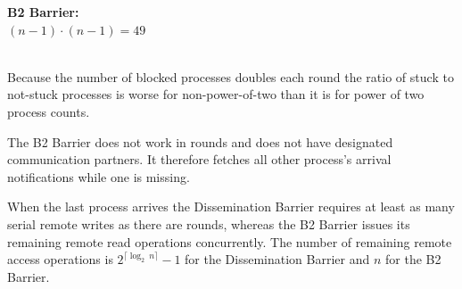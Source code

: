 \documentclass[a4paper, 10pt]{article}
\begin{document}
\begin{table}[htbp]
\begin{minipage}{0.42\linewidth}
{	}
\end{minipage}
\begin{minipage}{0.42\linewidth}
	\vspace{0.3cm}
	\textbf{B2 Barrier:} \\
	$(n-1) \cdot (n-1) = 49$ \\
	\vspace{-0.1cm} \\
\end{minipage}
\label{tab:table-dissemination-progress}
\end{table}

Because the number of blocked processes doubles each round the ratio of stuck to not-stuck processes is worse for non-power-of-two than it is for power of two process counts.

The B2 Barrier does not work in rounds and does not have designated communication partners. It therefore fetches all other process's arrival notifications while one is missing.

When the last process arrives the Dissemination Barrier requires at least as many serial remote writes as there are rounds, whereas the B2 Barrier issues its remaining remote read operations concurrently. The number of remaining remote access operations is $2^{\lceil \log_2~n \rceil} - 1$ for the Dissemination Barrier and $n$ for the B2 Barrier.
\end{document}
